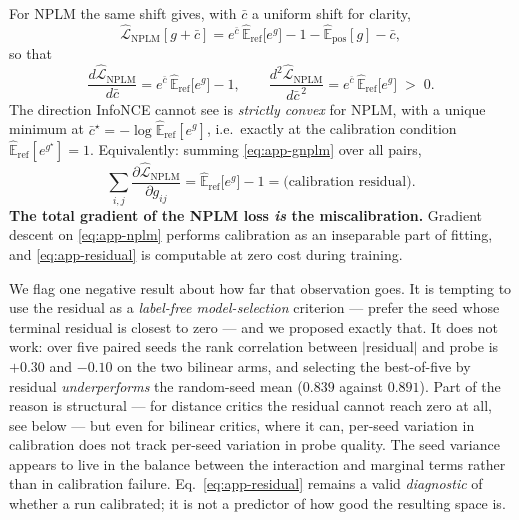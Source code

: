 \documentclass{article}
\newcommand{\E}{\mathbb{E}}
\begin{document}
For NPLM the same shift gives, with $\bar{c}$ a uniform shift for clarity,
\begin{equation}
\widehat{\mathcal{L}}_{\mathrm{NPLM}}[g+\bar c]
= e^{\bar c}\,\widehat{\E}_{\mathrm{ref}}\big[e^{g}\big] - 1
- \widehat{\E}_{\mathrm{pos}}[g] - \bar c,
\end{equation}
so that
\begin{equation}
\frac{d\widehat{\mathcal{L}}_{\mathrm{NPLM}}}{d\bar c}
= e^{\bar c}\,\widehat{\E}_{\mathrm{ref}}\big[e^{g}\big] - 1,
\qquad
\frac{d^2\widehat{\mathcal{L}}_{\mathrm{NPLM}}}{d\bar c^{\,2}}
= e^{\bar c}\,\widehat{\E}_{\mathrm{ref}}\big[e^{g}\big] \;>\; 0 .
\label{eq:app-convex}
\end{equation}
The direction InfoNCE cannot see is \emph{strictly convex} for NPLM, with a
unique minimum at $\bar c^\star = -\log\widehat{\E}_{\mathrm{ref}}[e^{g}]$,
i.e.\ exactly at the calibration condition
$\widehat{\E}_{\mathrm{ref}}[e^{g^\star}]=1$. Equivalently: summing
\eqref{eq:app-gnplm} over all pairs,
\begin{equation}
\sum_{i,j}\frac{\partial\widehat{\mathcal{L}}_{\mathrm{NPLM}}}{\partial g_{ij}}
= \widehat{\E}_{\mathrm{ref}}\big[e^{g}\big] - 1
= \text{(calibration residual)} .
\label{eq:app-residual}
\end{equation}
\textbf{The total gradient of the NPLM loss \emph{is} the miscalibration.}
Gradient descent on \eqref{eq:app-nplm} performs calibration as an inseparable
part of fitting, and \eqref{eq:app-residual} is computable at zero cost during
training.

We flag one negative result about how far that observation goes. It is
tempting to use the residual as a \emph{label-free model-selection} criterion
--- prefer the seed whose terminal residual is closest to zero --- and we
proposed exactly that. It does not work: over five paired seeds the rank
correlation between $|$residual$|$ and probe is $+0.30$ and $-0.10$ on the two
bilinear arms, and selecting the best-of-five by residual \emph{underperforms}
the random-seed mean ($0.839$ against $0.891$). Part of the reason is
structural --- for distance critics the residual cannot reach zero at all, see
below --- but even for bilinear critics, where it can, per-seed variation in
calibration does not track per-seed variation in probe quality. The seed
variance appears to live in the balance between the interaction and marginal
terms rather than in calibration failure. Eq.~\eqref{eq:app-residual} remains a
valid \emph{diagnostic} of whether a run calibrated; it is not a predictor of
how good the resulting space is.
\end{document}
